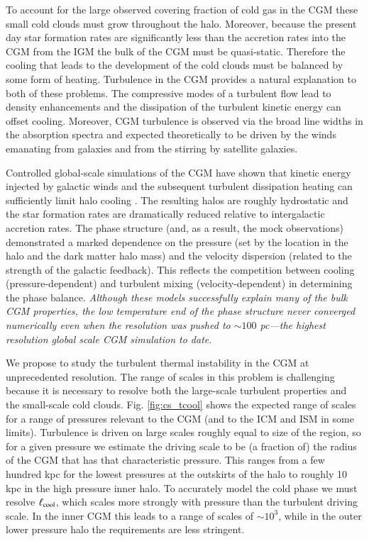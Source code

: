 \documentclass[11pt,letterpaper,english]{article}
\begin{document}
To account for the large observed covering fraction of cold gas in the CGM these small cold clouds must grow throughout the halo. Moreover, because the present day star formation rates are significantly less than the accretion rates into the CGM from the IGM the bulk of the CGM must be quasi-static. Therefore the cooling that leads to the development of the cold clouds must be balanced by some form of heating. Turbulence in the CGM provides a natural explanation to both of these problems. The compressive modes of a turbulent flow lead to density enhancements and the dissipation of the turbulent kinetic energy can offset cooling. Moreover, CGM turbulence is observed via the broad line widths in the absorption spectra and expected theoretically to be driven by the winds emanating from galaxies and from the stirring by satellite galaxies. 

Controlled global-scale simulations of the CGM have shown that kinetic energy injected by galactic winds and the subsequent turbulent dissipation heating can sufficiently limit halo cooling \cite{Fielding17}. 
The resulting halos are roughly hydrostatic and the star formation rates are dramatically reduced relative to intergalactic accretion rates. 
The phase structure (and, as a result, the mock observations) demonstrated a marked dependence on the pressure (set by the location in the halo and the dark matter halo mass) and the velocity dispersion (related to the strength of the galactic feedback). 
This reflects the competition between cooling (pressure-dependent) and turbulent mixing (velocity-dependent) in determining the phase balance.
{\em Although these models successfully explain many of the bulk CGM properties, the low temperature end of the phase structure never converged numerically even when the resolution was pushed to $\sim 100$ pc---the highest resolution global scale CGM simulation to date}. 

We propose to study the turbulent thermal instability in the CGM at unprecedented resolution. The range of scales in this problem is challenging because it is necessary to resolve both the large-scale turbulent properties and the small-scale cold clouds. Fig. \ref{fig:cs_tcool} shows the expected range of scales for a range of pressures relevant to the CGM (and to the ICM and ISM in some limits). Turbulence is driven on large scales roughly equal to size of the region, so for a given pressure we estimate the driving scale to be (a fraction of) the radius of the CGM that has that characteristic pressure. This ranges from a few hundred kpc for the lowest pressures at the outskirts of the halo to roughly 10 kpc in the high pressure inner halo. To accurately model the cold phase we must resolve $\ell_{\rm cool}$, which scales more strongly with pressure than the turbulent driving scale. In the inner CGM this leads to a range of scales of $\sim10^3$, while in the outer lower pressure halo the requirements are less stringent.
\end{document}
